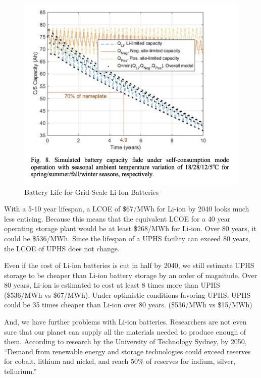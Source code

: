 \documentclass[hidelinks,12pt,a4paper]{article}
\begin{document}
\begin{figure}[ht!]
    \centering
    \includegraphics[width=.75\textwidth]{li-ion-battery-life.png}
    \caption{Battery Life for Grid-Scale Li-Ion Batteries \cite{LifePredictionModelForLiIonBattery}}
\end{figure}
\FloatBarrier

With a 5-10 year lifespan, a LCOE of \$67/MWh for Li-ion by 2040 looks much less enticing. Because this means that the equivalent LCOE for a 40 year operating storage plant would be at least \$268/MWh for Li-ion. Over 80 years, it could be \$536/MWh. Since the lifespan of a UPHS facility can exceed 80 years, the LCOE of UPHS does not change.

\begin{displayquote}
Even if the cost of Li-ion batteries is cut in half by 2040, we still estimate UPHS storage to be cheaper than Li-ion battery storage by an order of magnitude. Over 80 years, Li-ion is estimated to cost at least 8 times more than UPHS (\$536/MWh vs \$67/MWh). Under optimistic conditions favoring UPHS, UPHS could be 35 times cheaper than Li-ion over 80 years. (\$536/MWh vs \$15/MWh)
\end{displayquote}

And, we have further problems with Li-ion batteries. Researchers are not even sure that our planet can supply all the materials needed to produce enough of them. According to research by the University of Technology Sydney, by 2050, “Demand from renewable energy and storage technologies could exceed reserves for cobalt, lithium and nickel, and reach 50\% of reserves for indium, silver, tellurium.”
\end{document}
